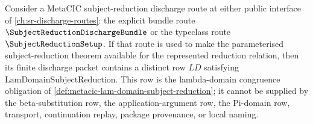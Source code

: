 \begin{proposition}\label{prop:metacic-lam-domain-setup-row-mandatory}
Consider a MetaCIC subject-reduction discharge route at either public interface of \autoref{ch:sr-discharge-routes}: the explicit bundle route $\SubjectReductionDischargeBundle$ or the typeclass route $\SubjectReductionSetup$. If that route is used to make the parameterised subject-reduction theorem available for the represented reduction relation, then its finite discharge packet contains a distinct row $LD$ satisfying $\mathrm{LamDomainSubjectReduction}$. This row is the lambda-domain congruence obligation of \autoref{def:metacic-lam-domain-subject-reduction}; it cannot be supplied by the beta-substitution row, the application-argument row, the Pi-domain row, transport, continuation replay, package provenance, or local naming.
\end{proposition}
